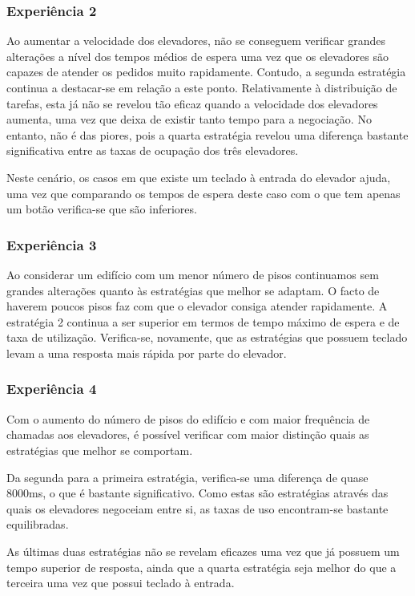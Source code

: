 ﻿\documentclass[a4paper]{article}
\begin{document}
\subsubsection{Experiência 2}

Ao aumentar a velocidade dos elevadores, não se conseguem verificar grandes alterações a nível dos tempos médios de espera uma vez que os elevadores são capazes de atender os pedidos muito rapidamente. Contudo, a segunda estratégia continua a destacar-se em relação a este ponto. Relativamente à distribuição de tarefas, esta já não se revelou tão eficaz quando a velocidade dos elevadores aumenta, uma vez que deixa de existir tanto tempo para a negociação. No entanto, não é das piores, pois a quarta estratégia revelou uma diferença bastante significativa entre as taxas de ocupação dos três elevadores.

Neste cenário, os casos em que existe um teclado à entrada do elevador ajuda, uma vez que comparando os tempos de espera deste caso com o que tem apenas um botão verifica-se que são inferiores.

\subsubsection{Experiência 3}

Ao considerar um edifício com um menor número de pisos continuamos sem grandes alterações quanto às estratégias que melhor se adaptam. O facto de haverem poucos pisos faz com que o elevador consiga atender rapidamente. A estratégia 2 continua a ser superior em termos de tempo máximo de espera e de taxa de utilização. Verifica-se, novamente, que as estratégias que possuem teclado levam a uma resposta mais rápida por parte do elevador.

\subsubsection{Experiência 4}

Com o aumento do número de pisos do edifício e com maior frequência de chamadas aos elevadores, é possível verificar com maior distinção quais as estratégias que melhor se comportam. 

Da segunda para a primeira estratégia, verifica-se uma diferença de quase 8000ms, o que é bastante significativo. Como estas são estratégias através das quais os elevadores negoceiam entre si, as taxas de uso encontram-se bastante equilibradas.

As últimas duas estratégias não se revelam eficazes uma vez que já possuem um tempo superior de resposta, ainda que a quarta estratégia seja melhor do que a terceira uma vez que possui teclado à entrada.
\end{document}
